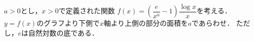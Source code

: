 \documentclass[../../main.tex]{subfiles}
\begin{document}
$a>0$とし，$x>0$で定義された関数
$\displaystyle f(x)= \left( \dfrac{e}{x^a}-1 \right) \dfrac{\log x}{x}$を考える．
$y=f(x)$のグラフより下側で$x$軸より上側の部分の面積を$a$であらわせ．
ただし，$e$は自然対数の底である．
\end{document}
